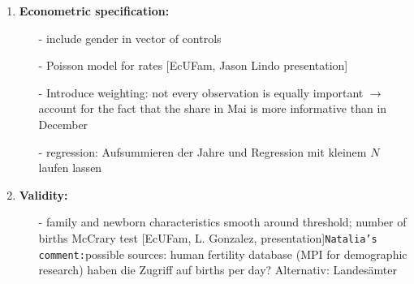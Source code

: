 \documentclass[11pt,a4paper]{article}
\begin{document}
{\begin{enumerate}
\item \textbf{Econometric specification:}\vspace{-1em}
\begin{itemize}
	\item[-] include gender in vector of controls
	\item[-] Poisson model for rates [EcUFam, Jason Lindo presentation]
	\item[-] Introduce weighting: not every observation is equally important $\rightarrow$ account for the fact that the share in Mai is more informative than in December
	\item[-] regression: Aufsummieren der Jahre und Regression mit kleinem $N$ laufen lassen
\end{itemize}


\item \textbf{Validity:}\vspace{-1em}
\begin{itemize}
	\item[-] family and newborn characteristics smooth around threshold; number of births McCrary test [EcUFam, L. Gonzalez, presentation]\newline \texttt{Natalia's comment:}possible sources: human fertility database (MPI for demographic research) haben die Zugriff auf births per day? Alternativ: Landesämter
\end{itemize}



\end{enumerate}}
\end{document}
